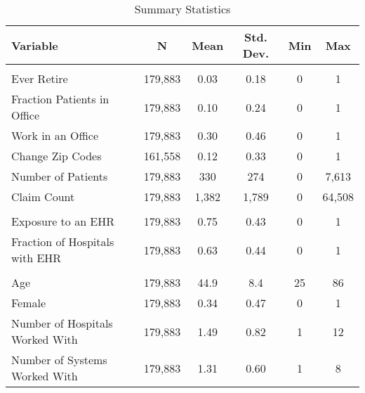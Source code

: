 


\begin{table}[ht]

\caption{Summary Statistics}
\centering
\begin{tabular}[t]{lccccc}
\toprule
Variable & N & Mean & Std. Dev. & Min & Max\\
\midrule
\addlinespace[0.3em]
\multicolumn{6}{l}{\textbf{Outcomes}}\\
\hspace{1em}Ever Retire & 179,883 & 0.03 & 0.18 & 0 & 1\\
\hspace{1em}Fraction Patients in Office & 179,883 & 0.10 & 0.24 & 0 & 1\\
\hspace{1em}Work in an Office & 179,883 & 0.30 & 0.46 & 0 & 1\\
\hspace{1em}Change Zip Codes & 161,558 & 0.12 & 0.33 & 0 & 1\\
\hspace{1em}Number of Patients & 179,883 & 330 & 274 & 0 & 7,613\\
\hspace{1em}Claim Count & 179,883 & 1,382 & 1,789 & 0 & 64,508\\
\addlinespace[0.3em]
\multicolumn{6}{l}{\textbf{Treatment}}\\
\hspace{1em}Exposure to an EHR & 179,883 & 0.75 & 0.43 & 0 & 1\\
\hspace{1em}Fraction of Hospitals with EHR & 179,883 & 0.63 & 0.44 & 0 & 1\\
\addlinespace[0.3em]
\multicolumn{6}{l}{\textbf{Characteristics}}\\
\hspace{1em}Age & 179,883 & 44.9 & 8.4 & 25 & 86\\
\hspace{1em}Female & 179,883 & 0.34 & 0.47 & 0 & 1\\
\hspace{1em}Number of Hospitals Worked With & 179,883 & 1.49 & 0.82 & 1 & 12\\
\hspace{1em}Number of Systems Worked With & 179,883 & 1.31 & 0.60 & 1 & 8\\
\bottomrule
\end{tabular}
\label{tab:sumstats}
\end{table}
